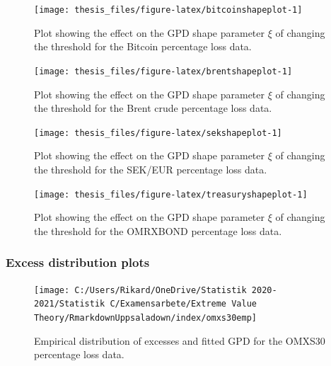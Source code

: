 \documentclass[a4paper,11pt]{article}
\theoremstyle{definition}
\theoremstyle{definition}
\theoremstyle{definition}
\theoremstyle{definition}
\theoremstyle{remark}
\begin{document}
\begin{figure}[H]

{\centering \texttt{[image: thesis\_files/figure-latex/bitcoinshapeplot-1]} 

}

\caption{Plot showing the effect on the GPD shape parameter $\xi$ of changing the threshold for the Bitcoin percentage loss data.}\label{fig:bitcoinshapeplot}
\end{figure}
\begin{figure}[H]

{\centering \texttt{[image: thesis\_files/figure-latex/brentshapeplot-1]} 

}

\caption{Plot showing the effect on the GPD shape parameter $\xi$ of changing the threshold for the Brent crude percentage loss data.}\label{fig:brentshapeplot}
\end{figure}
\begin{figure}[H]

{\centering \texttt{[image: thesis\_files/figure-latex/sekshapeplot-1]} 

}

\caption{Plot showing the effect on the GPD shape parameter $\xi$ of changing the threshold for the SEK/EUR percentage loss data.}\label{fig:sekshapeplot}
\end{figure}
\begin{figure}[H]

{\centering \texttt{[image: thesis\_files/figure-latex/treasuryshapeplot-1]} 

}

\caption{Plot showing the effect on the GPD shape parameter $\xi$ of changing the threshold for the OMRXBOND percentage loss data.}\label{fig:treasuryshapeplot}
\end{figure}
\hypertarget{sec:empplots}{%
\subsubsection{Excess distribution plots}\label{sec:empplots}}
\begin{figure}[H]

{\centering \texttt{[image: C:/Users/Rikard/OneDrive/Statistik 2020-2021/Statistik C/Examensarbete/Extreme Value Theory/RmarkdownUppsaladown/index/omxs30emp]} 

}

\caption{Empirical distribution of excesses and fitted GPD for the OMXS30 percentage loss data.}\label{fig:empomxs30}
\end{figure}
\end{document}
